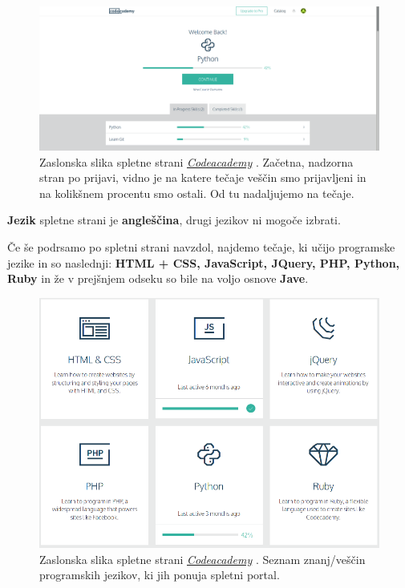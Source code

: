 \begin{figure}[h!]
    \includegraphics [width=1\linewidth, keepaspectratio =
    1] {./images/sc_web/codeacademy_login_01.png}
    \caption{Zaslonska slika spletne strani
      \emph{\href{https://www.codecademy.com/}{Codeacademy}}
      \cite{web:codeacademy}. Začetna, nadzorna stran po prijavi,
      vidno je na katere tečaje veščin smo prijavljeni in na kolikšnem
    procentu smo ostali. Od tu nadaljujemo na tečaje.}
    \label{fig:scr:web:codeacademy}
\end{figure}

\textbf{Jezik} spletne strani je \textbf{angleščina}, drugi jezikov ni
mogoče izbrati.

Če še podrsamo po spletni strani navzdol, najdemo tečaje, ki učijo
programske jezike in so naslednji: \textbf{HTML + CSS, JavaScript,
  JQuery, PHP, Python, Ruby} in že v prejšnjem odseku so bile na voljo
osnove \textbf{Jave}.

\begin{figure}[h!]
  \centering
    \includegraphics [width=0.65\linewidth, keepaspectratio =
    1] {./images/sc_web/codeacademy_vescine_02.png}
    \caption{Zaslonska slika spletne strani
      \emph{\href{https://www.codecademy.com/}{Codeacademy}}
      \cite{web:codeacademy}. Seznam znanj/veščin programskih jezikov,
      ki jih ponuja spletni portal.}
    \label{fig:scr:web:codeacademy:vescine-prog}
\end{figure}

